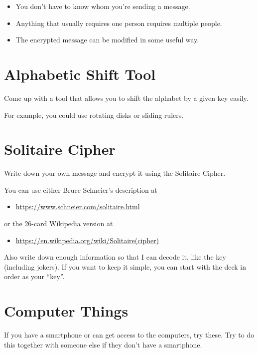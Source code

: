 \documentclass[12pt]{article}
\begin{document}
\begin{itemize}
\item You don't have to know whom you're sending a message.
\item Anything that usually requires one person requires multiple people.
\item The encrypted message can be modified in some useful way.
\end{itemize}


\section{Alphabetic Shift Tool}

Come up with a tool that allows you to shift the alphabet by a given key easily.

For example, you could use rotating disks or sliding rulers.

\section{Solitaire Cipher}

Write down your own message and encrypt it using the Solitaire Cipher.


\vspace{2em}

You can use either Bruce Schneier's description at
\begin{itemize}
\item \href{https://www.schneier.com/solitaire.html}{https://www.schneier.com/solitaire.html}
\end{itemize}

or the 26-card Wikipedia version at 

\begin{itemize}
\item \href{https://en.wikipedia.org/wiki/Solitaire_(cipher)}{https://en.wikipedia.org/wiki/Solitaire\textunderscore(cipher)}
\end{itemize}

Also write down enough information so that I can decode it, like the key (including jokers).
If you want to keep it simple, you can start with the deck in order as your ``key''.


\newpage
\section*{Computer Things}

If you have a smartphone or can get access to the computers, try these. Try to do this together with someone else if they don't have a smartphone.
\end{document}
